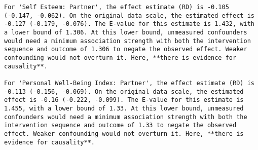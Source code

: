 \documentclass[
  singlecolumn]{article}
\begin{document}
\begin{verbatim}
For 'Self Esteem: Partner', the effect estimate (RD) is -0.105 (-0.147, -0.062). On the original data scale, the estimated effect is -0.127 (-0.179, -0.076). The E-value for this estimate is 1.432, with a lower bound of 1.306. At this lower bound, unmeasured confounders would need a minimum association strength with both the intervention sequence and outcome of 1.306 to negate the observed effect. Weaker confounding would not overturn it. Here, **there is evidence for causality**.

For 'Personal Well-Being Index: Partner', the effect estimate (RD) is -0.113 (-0.156, -0.069). On the original data scale, the estimated effect is -0.16 (-0.222, -0.099). The E-value for this estimate is 1.455, with a lower bound of 1.33. At this lower bound, unmeasured confounders would need a minimum association strength with both the intervention sequence and outcome of 1.33 to negate the observed effect. Weaker confounding would not overturn it. Here, **there is evidence for causality**.
\end{verbatim}
\end{document}

